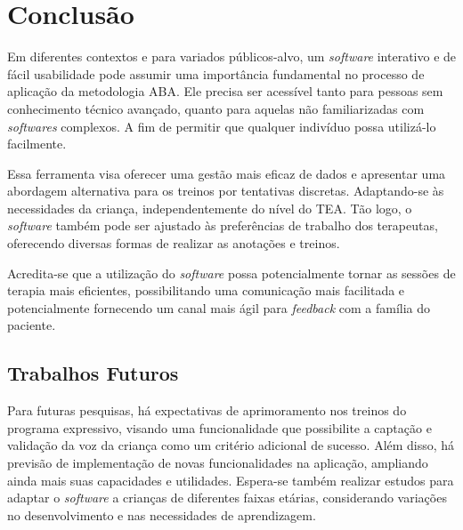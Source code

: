 \chapter{Conclusão}\label{cap:conclusao}

Em diferentes contextos e para variados públicos-alvo, um \textit{software} interativo 
e de fácil usabilidade pode assumir uma importância fundamental no processo de aplicação 
da metodologia ABA. Ele precisa ser acessível tanto para pessoas sem conhecimento técnico avançado, 
quanto para aquelas não familiarizadas com \textit{softwares} complexos. A fim de permitir que 
qualquer indivíduo possa utilizá-lo facilmente. 

Essa ferramenta visa oferecer uma gestão mais eficaz de dados e apresentar uma abordagem alternativa 
para os treinos por tentativas discretas. Adaptando-se às necessidades da criança, independentemente 
do nível do TEA. Tão logo, o \textit{software} também pode ser ajustado às preferências de trabalho 
dos terapeutas, oferecendo diversas formas de realizar as anotações e treinos.

Acredita-se que a utilização do \textit{software} possa potencialmente tornar as sessões 
de terapia mais eficientes, possibilitando uma comunicação mais facilitada e potencialmente 
fornecendo um canal mais ágil para \textit{feedback} com a família do paciente.

\section{Trabalhos Futuros}

Para futuras pesquisas, há expectativas de aprimoramento nos treinos do programa expressivo, 
visando uma funcionalidade que possibilite a captação e validação da voz da criança como um 
critério adicional de sucesso. Além disso, há previsão de implementação de novas funcionalidades 
na aplicação, ampliando ainda mais suas capacidades e utilidades. Espera-se também realizar estudos 
para adaptar o \textit{software} a crianças de diferentes faixas etárias, 
considerando variações no desenvolvimento e nas necessidades de aprendizagem.

